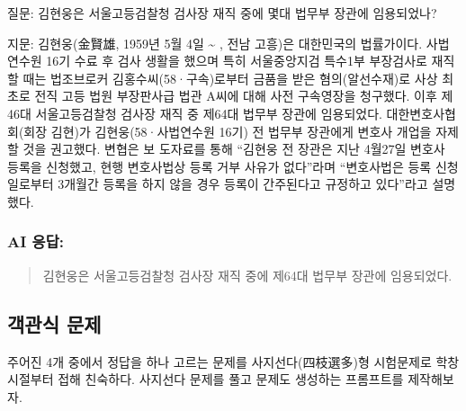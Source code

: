 \documentclass[
  letterpaper,
]{book}
\begin{document}
\begin{tcolorbox}[enhanced jigsaw, opacityback=0, opacitybacktitle=0.6, colback=white, rightrule=.15mm, coltitle=black, colframe=quarto-callout-note-color-frame, colbacktitle=quarto-callout-note-color!10!white, bottomrule=.15mm, bottomtitle=1mm, breakable, title=\textcolor{quarto-callout-note-color}{\faInfo}\hspace{0.5em}{프롬프트: 다음 지문을 읽고 답을 찾으세요.}, titlerule=0mm, leftrule=.75mm, toptitle=1mm, left=2mm, arc=.35mm, toprule=.15mm]

질문: 김현웅은 서울고등검찰청 검사장 재직 중에 몇대 법무부 장관에
임용되었나?

지문: 김현웅(金賢雄, 1959년 5월 4일 \textasciitilde{} , 전남 고흥)은
대한민국의 법률가이다. 사법연수원 16기 수료 후 검사 생활을 했으며 특히
서울중앙지검 특수1부 부장검사로 재직할 때는 법조브로커
김홍수씨(58·구속)로부터 금품을 받은 혐의(알선수재)로 사상 최초로 전직
고등 법원 부장판사급 법관 A씨에 대해 사전 구속영장을 청구했다. 이후
제46대 서울고등검찰청 검사장 재직 중 제64대 법무부 장관에 임용되었다.
대한변호사협회(회장 김현)가 김현웅(58·사법연수원 16기) 전 법무부
장관에게 변호사 개업을 자제할 것을 권고했다. 변협은 보 도자료를 통해
``김현웅 전 장관은 지난 4월27일 변호사 등록을 신청했고, 현행 변호사법상
등록 거부 사유가 없다''라며 ``변호사법은 등록 신청일로부터 3개월간
등록을 하지 않을 경우 등록이 간주된다고 규정하고 있다''라고 설명했다.

\hypertarget{ai-uxc751uxb2f5-7}{%
\subsubsection*{AI 응답:}\label{ai-uxc751uxb2f5-7}}

\begin{quote}
김현웅은 서울고등검찰청 검사장 재직 중에 제64대 법무부 장관에
임용되었다.
\end{quote}

\end{tcolorbox}

\hypertarget{uxac1duxad00uxc2dd-uxbb38uxc81c}{%
\subsection{객관식 문제}\label{uxac1duxad00uxc2dd-uxbb38uxc81c}}

주어진 4개 중에서 정답을 하나 고르는 문제를 사지선다(四枝選多)형
시험문제로 학창시절부터 접해 친숙하다. 사지선다 문제를 풀고 문제도
생성하는 프롬프트를 제작해보자.
\end{document}

